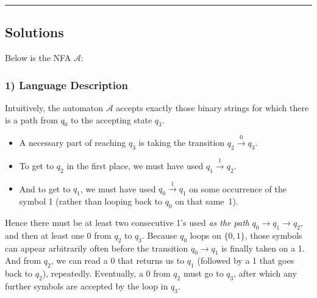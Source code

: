 \documentclass{article}
\theoremstyle{theorem}
\theoremstyle{definition}
\theoremstyle{remark}
\begin{document}
\bigskip
\hrule
\bigskip

\subsection*{Solutions}

Below is the NFA $\mathcal{A}$:

\begin{center}
\end{center}

\subsubsection*{1) Language Description}
Intuitively, the automaton $\mathcal{A}$ accepts exactly those binary strings for which there is a path from $q_0$ to the accepting state $q_3$.  
\begin{itemize}
\item A necessary part of reaching $q_3$ is taking the transition $q_2 \xrightarrow{0} q_3$. 
\item To get to $q_2$ in the first place, we must have used $q_1 \xrightarrow{1} q_2$. 
\item And to get to $q_1$, we must have used $q_0 \xrightarrow{1} q_1$ on some occurrence of the symbol 1 (rather than looping back to $q_0$ on that same~1).
\end{itemize}
Hence there must be at least two consecutive 1's used \emph{as the path} $q_0 \to q_1 \to q_2$, and then at least one 0 from $q_2$ to $q_3$.  Because $q_0$ loops on $\{0,1\}$, those symbols can appear arbitrarily often before the transition $q_0\to q_1$ is finally taken on a 1.  And from $q_2$, we can read a 0 that returns us to $q_1$ (followed by a 1 that goes back to $q_2$), repeatedly.  Eventually, a 0 from $q_2$ must go to $q_3$, after which any further symbols are accepted by the loop in $q_3$.  
\end{document}
